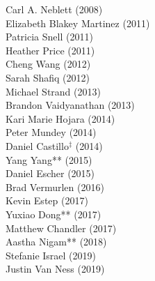 \medskip
{}
\begin{multicols}{2}
\noindent
    Carl A. Neblett (2008) \\
    Elizabeth Blakey Martinez (2011) \\
    Patricia Snell (2011) \\
    Heather Price (2011) \\
    Cheng Wang (2012) \\
    Sarah Shafiq (2012) \\
    Michael Strand (2013) \\
    Brandon Vaidyanathan (2013) \\
    Kari Marie Hojara (2014) \\
    Peter Mundey (2014) \\
    Daniel Castillo\textcolor{uclablue}{$^{\ddag}$} (2014)  \\
    Yang Yang\textcolor{uclablue}{**} (2015) \\
    Daniel Escher (2015) \\
    Brad Vermurlen (2016) \\
    Kevin Estep (2017) \\
    Yuxiao Dong\textcolor{uclablue}{**}  (2017) \\
    Matthew Chandler (2017) \\
    Aastha Nigam\textcolor{uclablue}{**}  (2018) \\
    Stefanie Israel (2019) \\
    Justin Van Ness (2019) 
\end{multicols}